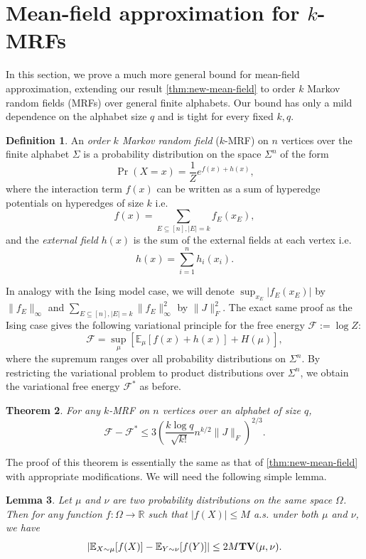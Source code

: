\documentclass[11pt, oneside, english]{article}
\newcommand{\bE}{\mathbb{E}}
\newcommand{\R}{\mathbb{R}}
\newcommand{\F}{\mathcal{F}}
\newcommand{\E}{\bE}      %
\newcommand{\TV}{{\bf TV}}
\newtheorem{theorem}{Theorem}[section]
\newtheorem{lemma}[theorem]{Lemma}
\theoremstyle{definition}
\newtheorem{definition}[theorem]{Definition}
\theoremstyle{plain}
\begin{document}
\section{Mean-field approximation for $k$-MRFs}
\label{sec:mrf}
In this section, we prove a much more general bound for mean-field approximation, extending our result \cref{thm:new-mean-field} to order $k$ Markov random fields (MRFs) over general finite alphabets. Our bound has only a mild dependence on the alphabet size $q$ and is tight for every fixed $k,q$. 
\begin{definition}
An \emph{order $k$ Markov random field} ($k$-MRF) on $n$ vertices over the finite alphabet $\Sigma$ is a probability distribution on the space $\Sigma^n$ of the form
\[ \Pr(X = x) = \frac{1}{Z} e^{f(x) + h(x)}, \]
where the interaction term $f(x)$ can be written as a sum of hyperedge potentials on hyperedges of size $k$ i.e. 
$$f(x) = \sum_{E\subseteq[n],|E|=k} f_E(x_E),$$
and the \emph{external field} $h(x)$ is the sum of the external fields at each vertex i.e. 
\[ h(x) = \sum_{i=1}^{n} h_i(x_i).\]
\end{definition}
In analogy with the Ising model case, we will denote $\sup_{x_E} |f_E(x_E)|$ by $\|f_E\|_{\infty}$ and $\sum_{E\subseteq[n], |E|=k} \|f_E\|_{\infty}^2$ by $\|J\|_F^{2}$.  
The exact same proof as the Ising case gives the following variational principle for the free energy $\F:=\log{Z}$:
\begin{equation}\label{eqn:variational-mrf}
\F = \sup_{\mu}\left[\E_{\mu}[f(x)+h(x)]+H(\mu)\right],
\end{equation}
where the supremum ranges over all probability distributions on $\Sigma^{n}$. By restricting the variational problem to product distributions over $\Sigma^{n}$, we obtain the variational free energy $\F^*$ as before.  
\begin{theorem}
\label{thm:MRF-mean-field}
For any $k$-MRF on $n$ vertices over an alphabet of size $q$,
\[ \F - \F^* \le 3\left(\frac{k \log q}{\sqrt{k!}} n^{k/2} \|J\|_F\right)^{2/3}. \]
\end{theorem}
The proof of this theorem is essentially the same as that of \cref{thm:new-mean-field} with appropriate modifications. We will need the following simple lemma. 
\begin{lemma}\label{lem:tv-lipschitz}
Let $\mu$ and $\nu$ are two probability distributions on the same space $\Omega$. Then for any function $f \colon \Omega \to \R$ such that $|f(X)| \le M$ a.s. under both $\mu$ and $\nu$, we have
\[ \left|\E_{X \sim \mu}[f(X)] - \E_{Y \sim \nu}[f(Y)]\right| \le 2M \TV(\mu, \nu). \]
\end{lemma}
\end{document}
